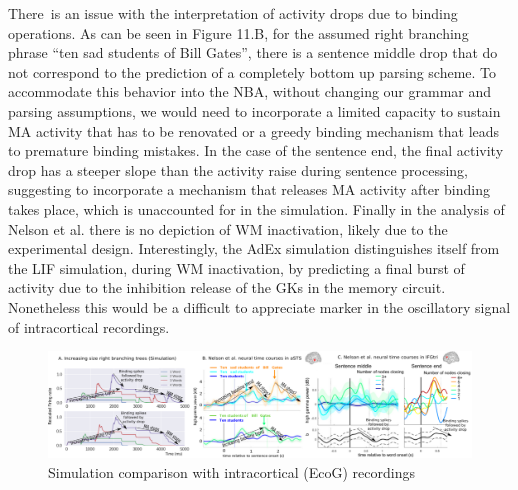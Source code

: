 \documentclass[10pt]{article}
\begin{document}
There~is an issue with the interpretation of activity drops due to binding operations.
As can be seen in Figure 11.B, for the assumed right branching phrase ``ten sad students of Bill Gates'', there is a sentence middle drop that do not correspond to the prediction of a completely bottom up parsing scheme.
To accommodate this behavior into the NBA, without changing our grammar and parsing assumptions, we would need to incorporate a limited capacity to sustain MA activity that has to be renovated or a greedy binding mechanism that leads to premature binding mistakes.
In the case of the sentence end, the final activity drop has a steeper slope than the activity raise during sentence processing, suggesting to incorporate a mechanism that releases MA activity after binding takes place, which is unaccounted for in the simulation.
Finally in the analysis of Nelson et al. there is no depiction of WM inactivation, likely due to the experimental design.
Interestingly, the AdEx simulation distinguishes itself from the LIF simulation, during WM inactivation, by predicting a final burst of activity due to the inhibition release of the GKs in the memory circuit.
Nonetheless this would be a difficult to appreciate marker in the oscillatory signal of intracortical recordings.

\begin{figure}[h!]
  \begin{center}
    \includegraphics[width=1.00\columnwidth]{figures/ecog_comparison2/ecog_comparison2}
    \caption{{Simulation comparison with intracortical (EcoG)
        recordings {\label{286166}}%
      }}
  \end{center}
\end{figure}
\end{document}
